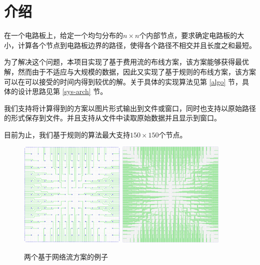 \section{介绍}
\qquad
在一个电路板上，给定一个均匀分布的$n\times n$个内部节点，要求确定电路板的大小，计算各个节点到电路板边界的路径，使得各个路径不相交并且长度之和最短。

为了解决这个问题，本项目实现了基于费用流的布线方案，该方案能够获得最优解，然而由于不适应与大规模的数据，因此又实现了基于规则的布线方案，该方案可以在可以接受的时间内得到较优的解。关于具体的实现算法见第 \ref{algo} 节，具体的设计思路见第 \ref{sys-arch} 节。

我们支持将计算得到的方案以图片形式输出到文件或窗口，同时也支持以原始路径的形式保存到文件。并且支持从文件中读取原始数据并且显示到窗口。

目前为止，我们基于规则的算法最大支持$150\times 150$个节点。

\begin{figure}[htpb]
	\centering
	\includegraphics[height=2in]{../testcase/small-cases/13x13-71x71.png}
	\includegraphics[height=2in]{../testcase/small-cases/24x24-201x201.png}
	\caption{两个基于网络流方案的例子}
\end{figure}
